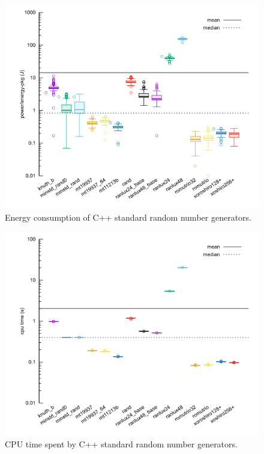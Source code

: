 \documentclass[sigconf]{acmart}
\begin{document}
\begin{figure}
\centering
\includegraphics[width=\columnwidth]{pkg.png}
\caption{Energy consumption of C++ standard random number generators.}
\label{fig:cpu}
\end{figure}

\begin{figure}
\centering
\includegraphics[width=\columnwidth]{cpu.png}
\caption{CPU time spent by C++ standard random number generators.}
\label{fig:pkg}
\end{figure}

\end{document}
